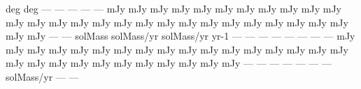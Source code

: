 deg
deg
---
---
---
---
---
mJy
mJy
mJy
mJy
mJy
mJy
mJy
mJy
mJy
mJy
mJy
mJy
mJy
mJy
mJy
mJy
mJy
mJy
mJy
mJy
mJy
mJy
mJy
mJy
mJy
mJy
mJy
mJy
mJy
---
---
solMass
solMass/yr
solMass/yr
yr-1
---
---
---
---
---
---
---
---
mJy
mJy
mJy
mJy
mJy
mJy
mJy
mJy
mJy
mJy
mJy
mJy
mJy
mJy
mJy
mJy
mJy
mJy
mJy
mJy
mJy
mJy
mJy
mJy
mJy
mJy
mJy
mJy
---
---
---
---
---
---
---
solMass/yr
---
---